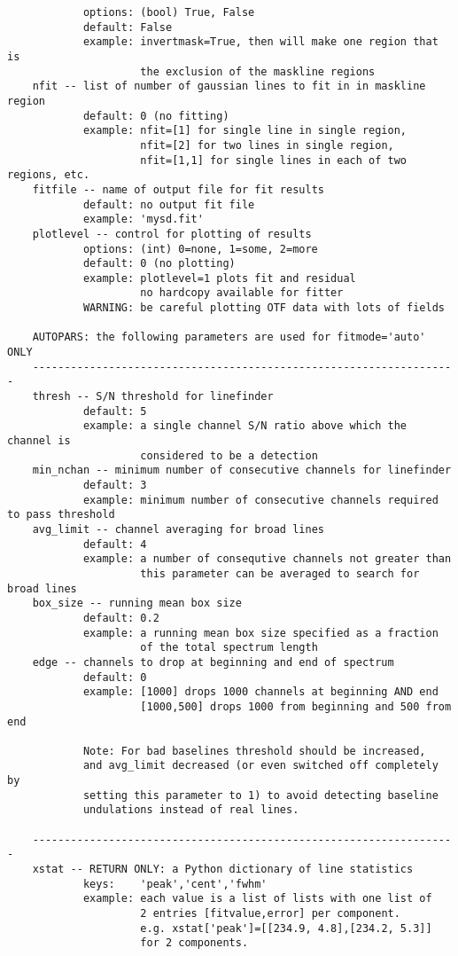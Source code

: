 \begin{itemize}
\begin{verbatim}
            options: (bool) True, False
            default: False
            example: invertmask=True, then will make one region that is
                     the exclusion of the maskline regions
    nfit -- list of number of gaussian lines to fit in in maskline region
            default: 0 (no fitting)
            example: nfit=[1] for single line in single region,
                     nfit=[2] for two lines in single region,
                     nfit=[1,1] for single lines in each of two regions, etc.
    fitfile -- name of output file for fit results
            default: no output fit file
            example: 'mysd.fit'
    plotlevel -- control for plotting of results
            options: (int) 0=none, 1=some, 2=more
            default: 0 (no plotting)
            example: plotlevel=1 plots fit and residual
                     no hardcopy available for fitter
            WARNING: be careful plotting OTF data with lots of fields
    
    AUTOPARS: the following parameters are used for fitmode='auto' ONLY
    -------------------------------------------------------------------
    thresh -- S/N threshold for linefinder
            default: 5
            example: a single channel S/N ratio above which the channel is
                     considered to be a detection
    min_nchan -- minimum number of consecutive channels for linefinder
            default: 3
            example: minimum number of consecutive channels required to pass threshold
    avg_limit -- channel averaging for broad lines
            default: 4
            example: a number of consequtive channels not greater than
                     this parameter can be averaged to search for broad lines
    box_size -- running mean box size
            default: 0.2
            example: a running mean box size specified as a fraction
                     of the total spectrum length
    edge -- channels to drop at beginning and end of spectrum
            default: 0
            example: [1000] drops 1000 channels at beginning AND end
                     [1000,500] drops 1000 from beginning and 500 from end
    
            Note: For bad baselines threshold should be increased,
            and avg_limit decreased (or even switched off completely by
            setting this parameter to 1) to avoid detecting baseline
            undulations instead of real lines.
    
    -------------------------------------------------------------------
    xstat -- RETURN ONLY: a Python dictionary of line statistics
            keys:    'peak','cent','fwhm'
            example: each value is a list of lists with one list of
                     2 entries [fitvalue,error] per component.
                     e.g. xstat['peak']=[[234.9, 4.8],[234.2, 5.3]]
                     for 2 components.
\end{verbatim}
    

\end{itemize}
